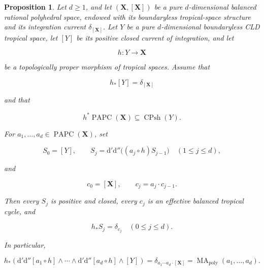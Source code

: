 \documentclass[11pt,a4paper]{article}
\newtheorem{proposition}[proposition]{Proposition}
\theoremstyle{definition}
\theoremstyle{remark}
\newcommand{\rd}{\mathrm d}
\newcommand{\dprime}{\rd'}
\newcommand{\ddprime}{\rd''}
\newcommand{\dprimeddprime}{\dprime\ddprime}
\DeclareMathOperator{\MA}{MA}
\begin{document}
\providecommand{\an}{\mathrm{an}}

\begin{proposition}\label{prop:p053-projection-recursion-repaired-candidate}
Let \(d\geq1\), and let \((\mathbf X,[\mathbf X])\) be a pure
\(d\)-dimensional balanced rational polyhedral space, endowed with its
boundaryless tropical-space structure and its integration current
\(\delta_{[\mathbf X]}\).  Let \(Y\) be a pure \(d\)-dimensional
boundaryless CLD tropical space, let \([Y]\) be its positive closed current
of integration, and let

\[
 h:Y\longrightarrow\mathbf X
\]

be a topologically proper morphism of tropical spaces.  Assume that

\begin{equation}
 h_*[Y]=\delta_{[\mathbf X]}
 \label{eq:p053-repaired-top-calibration}
\end{equation}

and that

\begin{equation}
 h^*\operatorname{PAPC}(\mathbf X)
 \subseteq \operatorname{CPsh}(Y).
 \label{eq:p053-repaired-psh-pullback}
\end{equation}

For \(a_1,\ldots,a_d\in\operatorname{PAPC}(\mathbf X)\), set

\begin{equation}
 S_0=[Y],\qquad
 S_j=\dprimeddprime\bigl((a_j\circ h)S_{j-1}\bigr)
 \quad (1\leq j\leq d),
 \label{eq:p053-repaired-source-recursion}
\end{equation}

and

\begin{equation}
 c_0=[\mathbf X],\qquad c_j=a_j\cdot c_{j-1}.
 \label{eq:p053-repaired-target-recursion}
\end{equation}

Then every \(S_j\) is positive and closed, every \(c_j\) is an effective
balanced tropical cycle, and

\begin{equation}
 h_*S_j=\delta_{c_j}
 \quad (0\leq j\leq d).
 \label{eq:p053-repaired-intermediate-pushforward}
\end{equation}

In particular,

\begin{equation}
 h_*\!\left(
   \dprimeddprime[a_1\circ h]\wedge\cdots\wedge
   \dprimeddprime[a_d\circ h]\wedge[Y]
 \right)
 =\delta_{a_1\cdots a_d\cdot[\mathbf X]}
 =\MA_{\mathrm{poly}}(a_1,\ldots,a_d).
 \label{eq:p053-repaired-pa-comparison}
\end{equation}


\end{proposition}
\end{document}
